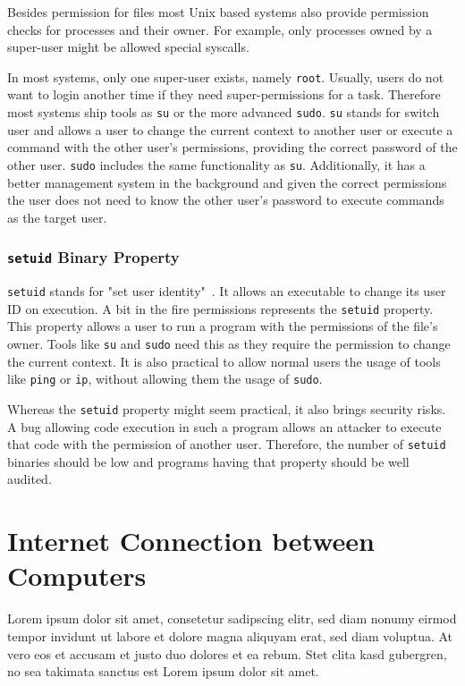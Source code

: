 Besides permission for files most Unix based systems also provide permission
checks for processes and their owner. For example, only processes owned by a
super-user might be allowed special syscalls.

In most systems, only one super-user exists, namely \texttt{root}. Usually,
users do not want to login another time if they need super-permissions for a
task. Therefore most systems ship tools as \texttt{su} or the more advanced
\texttt{sudo}. \texttt{su} stands for switch user and allows a user to change
the current context to another user or execute a command with the other user's
permissions, providing the correct password of the other user. \texttt{sudo}
includes the same functionality as \texttt{su}. Additionally, it has a better
management system in the background and given the correct permissions the user
does not need to know the other user's password to execute commands as the
target user.

\subsubsection{\texttt{setuid} Binary Property}

\texttt{setuid} stands for "set user identity"~.
It allows an executable to change its user ID on execution. A bit in the fire
permissions represents the \texttt{setuid} property. This property allows a user
to run a program with the permissions of the file's owner. Tools like
\texttt{su} and \texttt{sudo} need this as they require the permission to change
the current context. It is also practical to allow normal users the usage of
tools like \texttt{ping} or \texttt{ip}, without allowing them the usage of
\texttt{sudo}.

Whereas the \texttt{setuid} property might seem practical, it also brings
security risks. A bug allowing code execution in such a program allows an
attacker to execute that code with the permission of another user. Therefore,
the number of \texttt{setuid} binaries should be low and programs having that
property should be well audited.

\section{Internet Connection between Computers}


Lorem ipsum dolor sit amet, consetetur sadipscing elitr, sed diam nonumy eirmod
tempor invidunt ut labore et dolore magna aliquyam erat, sed diam voluptua. At
vero eos et accusam et justo duo dolores et ea rebum. Stet clita kasd gubergren,
no sea takimata sanctus est Lorem ipsum dolor sit amet.

